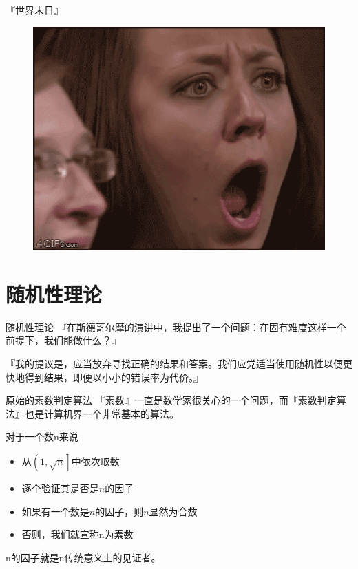 \documentclass{beamer}
\begin{document}
\begin{frame}{『世界末日』}
\begin{figure}
\begin{minipage}[b]{0.3\textwidth}
		\end{minipage}
		\begin{minipage}[b]{0.3\textwidth}\centering
			\includegraphics[scale=0.15]{figures/mgd3.eps}
		\end{minipage}
	\end{figure}
\end{frame}

\section{随机性理论}
\begin{frame}{随机性理论}
『在斯德哥尔摩的演讲中，我提出了一个问题：在固有难度这样一个前提下，我们能做什么？』\pause

『我的提议是，应当放弃寻找正确的结果和答案。我们应党适当使用随机性以便更快地得到结果，即便以小小的错误率为代价。』
\end{frame}

\begin{frame}{原始的素数判定算法}
	『素数』一直是数学家很关心的一个问题，而『素数判定算法』也是计算机界一个非常基本的算法。\pause
	
	对于一个数n来说
	\begin{itemize}
		\item 从$\left(1, \sqrt{n} \right]$中依次取数
		\item 逐个验证其是否是$n$的因子
		\item 如果有一个数是$n$的因子，则$n$显然为合数
		\item 否则，我们就宣称n为素数
	\end{itemize}
	
	n的因子就是n传统意义上的见证者。

\end{frame}
\end{document}
